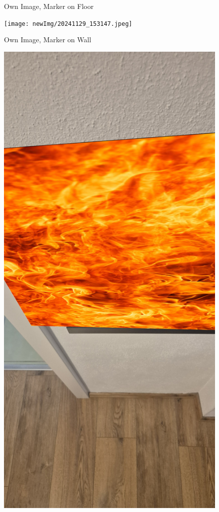 \documentclass[a4paper,twocolumn]{article}
\begin{document}
\begin{figure}[htbp]
    \caption{Own Image, Marker on Floor \cite{tim-schweitzer}}
    \label{fig:example-appendix2}
\end{figure}


\begin{figure}[htbp]
    \centering
    \texttt{[image: newImg/20241129\_153147.jpeg]}
    \caption{Own Image, Marker on Wall \cite{tim-schweitzer}}
    \label{fig:example-pappendix3}
\end{figure}

\begin{figure}[htbp]
    \centering
    \includegraphics[width=\columnwidth, keepaspectratio]{newOutput/20241129_153147.jpg}

\end{figure}
\end{document}

